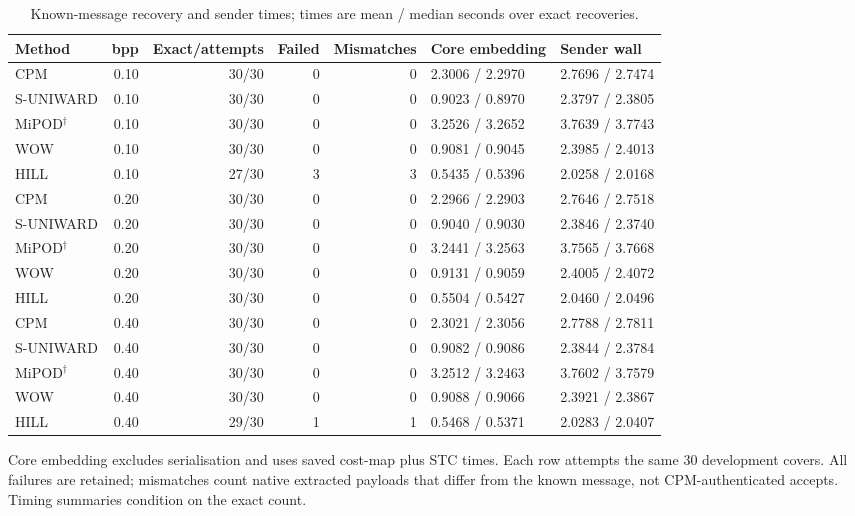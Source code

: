 \documentclass[journal]{IEEEtran}
\renewcommand{\arraystretch}{1.2}
\renewcommand{\arraystretch}{1.0}
\theoremstyle{definition}
\theoremstyle{game}
\renewcommand{\arraystretch}{1.5}
\begin{document}
\begin{table}[!t]
\centering\footnotesize
\caption{Known-message recovery and sender times; times are mean / median seconds over exact recoveries.}
\label{tab:hsm-fresh-sender}
\setlength{\tabcolsep}{4pt}\renewcommand{\arraystretch}{1.15}
\begin{tabular}{lrrrrll}
\toprule
Method & bpp & Exact/attempts & Failed & Mismatches & Core embedding & Sender wall\\
\midrule
CPM & 0.10 & 30/30 & 0 & 0 & 2.3006 / 2.2970 & 2.7696 / 2.7474\\
S-UNIWARD & 0.10 & 30/30 & 0 & 0 & 0.9023 / 0.8970 & 2.3797 / 2.3805\\
MiPOD$^\dagger$ & 0.10 & 30/30 & 0 & 0 & 3.2526 / 3.2652 & 3.7639 / 3.7743\\
WOW & 0.10 & 30/30 & 0 & 0 & 0.9081 / 0.9045 & 2.3985 / 2.4013\\
HILL & 0.10 & 27/30 & 3 & 3 & 0.5435 / 0.5396 & 2.0258 / 2.0168\\
CPM & 0.20 & 30/30 & 0 & 0 & 2.2966 / 2.2903 & 2.7646 / 2.7518\\
S-UNIWARD & 0.20 & 30/30 & 0 & 0 & 0.9040 / 0.9030 & 2.3846 / 2.3740\\
MiPOD$^\dagger$ & 0.20 & 30/30 & 0 & 0 & 3.2441 / 3.2563 & 3.7565 / 3.7668\\
WOW & 0.20 & 30/30 & 0 & 0 & 0.9131 / 0.9059 & 2.4005 / 2.4072\\
HILL & 0.20 & 30/30 & 0 & 0 & 0.5504 / 0.5427 & 2.0460 / 2.0496\\
CPM & 0.40 & 30/30 & 0 & 0 & 2.3021 / 2.3056 & 2.7788 / 2.7811\\
S-UNIWARD & 0.40 & 30/30 & 0 & 0 & 0.9082 / 0.9086 & 2.3844 / 2.3784\\
MiPOD$^\dagger$ & 0.40 & 30/30 & 0 & 0 & 3.2512 / 3.2463 & 3.7602 / 3.7579\\
WOW & 0.40 & 30/30 & 0 & 0 & 0.9088 / 0.9066 & 2.3921 / 2.3867\\
HILL & 0.40 & 29/30 & 1 & 1 & 0.5468 / 0.5371 & 2.0283 / 2.0407\\
\bottomrule
\end{tabular}
\par\smallskip\parbox{.97\textwidth}{\footnotesize Core embedding excludes serialisation and uses saved cost-map plus STC times. Each row attempts the same 30 development covers. All failures are retained; mismatches count native extracted payloads that
differ from the known message, not CPM-authenticated accepts. Timing
summaries condition on the exact count.}
\end{table}
\end{document}

